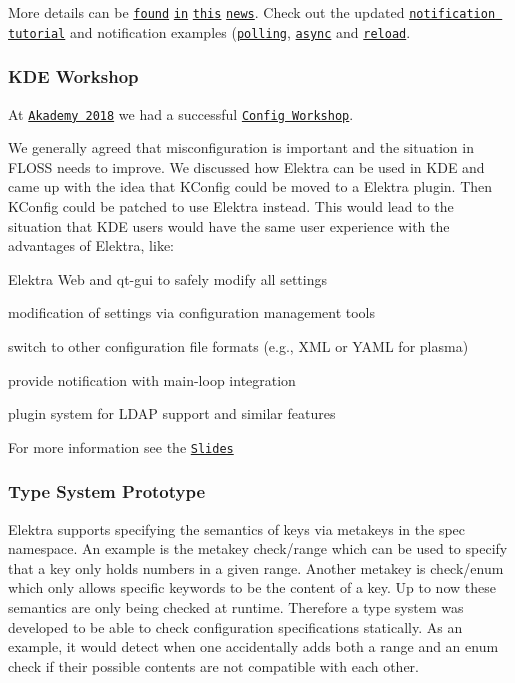 More details can be \href{#zeromq-transport-plugins}{\tt found} \href{#misc}{\tt in} \href{#bindings}{\tt this} \href{#notifications}{\tt news}. Check out the updated \href{https://www.libelektra.org/tutorials/notifications}{\tt notification tutorial} and notification examples (\href{https://www.libelektra.org/examples/notificationpolling}{\tt polling}, \href{https://www.libelektra.org/examples/notificationasync}{\tt async} and \href{https://www.libelektra.org/examples/notificationreload}{\tt reload}.

\subsubsection*{K\+DE Workshop}

At \href{https://akademy.kde.org/2018}{\tt Akademy 2018} we had a successful \href{https://community.kde.org/Akademy/2018/Config_Workshop}{\tt Config Workshop}.

We generally agreed that misconfiguration is important and the situation in F\+L\+O\+SS needs to improve. We discussed how Elektra can be used in K\+DE and came up with the idea that K\+Config could be moved to a Elektra plugin. Then K\+Config could be patched to use Elektra instead. This would lead to the situation that K\+DE users would have the same user experience with the advantages of Elektra, like\+:


\begin{DoxyItemize}
\item Elektra Web and qt-\/gui to safely modify all settings
\item modification of settings via configuration management tools
\item switch to other configuration file formats (e.\+g., X\+ML or Y\+A\+ML for plasma)
\item provide notification with main-\/loop integration
\item plugin system for L\+D\+AP support and similar features
\end{DoxyItemize}

For more information see the \href{http://www.complang.tuwien.ac.at/raab/akademy.pdf}{\tt Slides}

\subsubsection*{Type System Prototype}

Elektra supports specifying the semantics of keys via metakeys in the {\ttfamily spec} namespace. An example is the metakey {\ttfamily check/range} which can be used to specify that a key only holds numbers in a given range. Another metakey is {\ttfamily check/enum} which only allows specific keywords to be the content of a key. Up to now these semantics are only being checked at runtime. Therefore a type system was developed to be able to check configuration specifications statically. As an example, it would detect when one accidentally adds both a range and an enum check if their possible contents are not compatible with each other.

